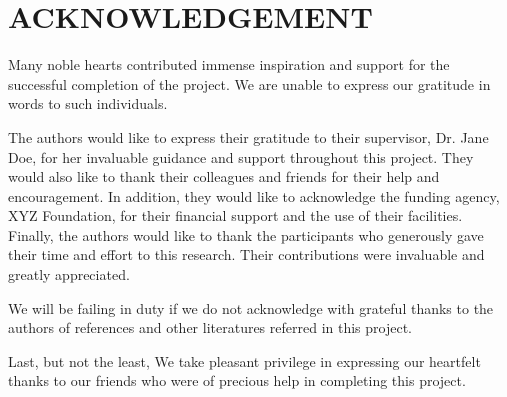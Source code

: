 \chapter*{\centering ACKNOWLEDGEMENT}

Many noble hearts contributed immense inspiration and support for the successful completion of the project. We are unable to express our gratitude in words to such individuals.

The authors would like to express their gratitude to their supervisor, Dr. Jane Doe, for her invaluable guidance and support throughout this project. They would also like to thank their colleagues and friends for their help and encouragement. In addition, they would like to acknowledge the funding agency, XYZ Foundation, for their financial support and the use of their facilities. Finally, the authors would like to thank the participants who generously gave their time and effort to this research. Their contributions were invaluable and greatly appreciated. 

We will be failing in duty if we do not acknowledge with grateful thanks to the authors of  references and other literatures referred in this project.

Last, but not the least, We take pleasant privilege in expressing our heartfelt thanks to our friends who were of precious help in completing this project.  
\vspace{1cm}
\\
\cSubmittedI \\
\cSubmittedII\\
\cSubmittedIII \\
\cSubmittedIV \\

